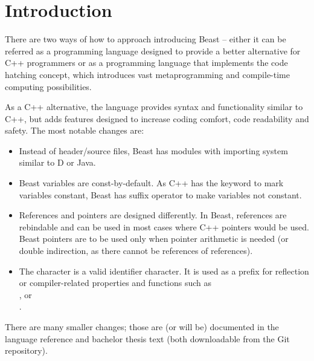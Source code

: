 \documentclass{ExcelAtFIT}
\affiliation{*%
  \href{mailto: xcejch00@stud.fit.vutbr.cz}{xcejch00@stud.fit.vutbr.cz},
  \textit{Faculty of Information Technology, Brno University of Technology}}
\begin{document}
\startdocument



\section{Introduction} \label{sec:intro}

There are two ways of how to approach introducing Beast -- either it can be referred as a programming language designed to provide a better alternative for C++ programmers or as a programming language that implements the code hatching concept, which introduces vast metaprogramming and compile-time computing possibilities.

As a C++ alternative, the language provides syntax and functionality similar to C++, but adds features designed to increase coding comfort, code readability and safety. The most notable changes are:
\begin{itemize}
	\item Instead of header/source files, Beast has modules with importing system similar to D or Java.
	\item Beast variables are const-by-default. As C++ has the  keyword to mark variables constant, Beast has  suffix operator to make variables not constant.
	\item References and pointers are designed differently. In Beast, references are rebindable and can be used in most cases where C++ pointers would be used. Beast pointers are to be used only when pointer arithmetic is needed (or double indirection, as there cannot be references of references).
	\item The \inlineCode{#} character is a valid identifier character. It is used as a prefix for reflection or compiler-related properties and functions such as \\,  or \\.
\end{itemize}

There are many smaller changes; those are (or will be) documented in the language reference and bachelor thesis text (both downloadable from the Git repository).
\end{document}

